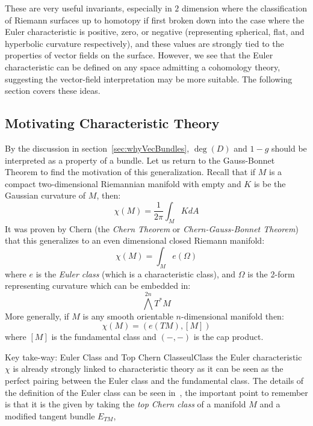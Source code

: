 \documentclass{ut-thesis}
\newcommand{\qn}{\quad\newline}
\renewcommand{\deg}{{\operatorname{deg}}}
\begin{document}
These are very useful invariants, especially in $2$ dimension where the classification of Riemann surfaces up
to homotopy if first broken down into the case where the Euler characteristic is positive, zero, or negative
(representing spherical, flat, and hyperbolic curvature respectively), and these values are strongly tied to
the properties of vector fields on the surface. However, we see that the Euler characteristic can be defined
on any space admitting a cohomology theory, suggesting the vector-field interpretation may be more suitable. The
following section covers these ideas.


\subsection{Motivating Characteristic Theory}\label{sec:motivatingCharTheory}

By the discussion in section~\ref{sec:whyVecBundles}, $\deg(D)$ and $1-g$ should be interpreted as a property
of a bundle. Let us return to the Gauss-Bonnet Theorem to find the motivation of this generalization. Recall
that if $M$ is a compact two-dimensional Riemannian manifold with empty and $K$ is be the Gaussian curvature
of $M$, then:
\[
  \chi(M) = \frac{1}{2\pi }\int_M K dA
\]
It was proven by Chern (the \emph{Chern Theorem} or \emph{Chern-Gauss-Bonnet Theorem}) that this generalizes
to an even dimensional closed Riemann manifold:
\[
  \chi(M) = \int_M e(\Omega)
\]
where $e$ is the \emph{Euler class} (which is a characteristic class), and $\Omega$ is the 2-form representing
curvature which can be embedded in: \[
  \bigwedge^{2n} T^*M
\]
More generally, if $M$ is any smooth orientable $n$-dimensional manifold then:
\[
  \chi(M) = (e(TM), [M])
\]
where $[M]$ is the fundamental class and $(-,-)$ is the cap product.

\begin{titledBox}{Key take-way: Euler Class and Top Chern Class}{eulClass}
  \qn
  the Euler characteristic $\chi$ is already strongly linked to characteristic theory as it can be seen as the
  perfect pairing between the Euler class and the fundamental class. The details of the definition of the
  Euler class can be seen in~\cite{NateKTheory}, the important point to remember is that it is the given by
  taking the \emph{top Chern class} of a manifold $M$ and a modified tangent bundle $E_{TM}$,
\end{titledBox}
\end{document}
